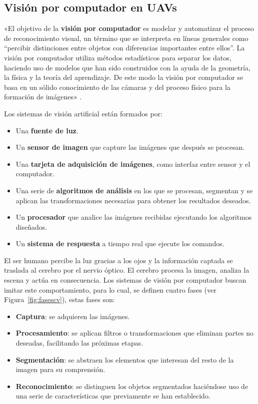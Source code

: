 \subsection{Visión por computador en \acs{UAV}s}
\label{sec:visionporcomputador}

«El objetivo de la \textbf{visión por computador} es modelar y automatizar el proceso de reconocimiento visual, un término que se interpreta en líneas generales como ``percibir distinciones entre objetos con diferencias importantes entre ellos''. La visión por computador utiliza métodos estadísticos para separar los datos, haciendo uso de modelos que han sido construidos con la ayuda de la geometría, la física y la teoría del aprendizaje. De este modo la visión por computador se basa en un sólido conocimiento de las cámaras y del proceso físico para la formación de imágenes» \cite{visionporcomputador}.

Los sistemas de visión artificial están formados por: 
\begin{itemize}
\item Una \textbf{fuente de luz}.
\item Un \textbf{sensor de imagen} que capture las imágenes que después se procesan.
\item Una \textbf{tarjeta de adquisición de imágenes}, como interfaz entre sensor y el computador.
\item Una serie de \textbf{algoritmos de análisis} en los que se procesan, segmentan y se aplican las transformaciones necesarias para obtener los resultados deseados. 
\item Un \textbf{procesador} que analice las imágenes recibidas ejecutando los algoritmos diseñados. 
\item Un \textbf{sistema de respuesta} a tiempo real que ejecute los comandos.
\end{itemize}

El ser humano percibe la luz gracias a los ojos y la información captada se traslada al cerebro por el nervio óptico. El cerebro procesa la imagen, analiza la escena y actúa en consecuencia. Los sistemas de visión por computador buscan imitar este comportamiento, para lo cual, se definen cuatro fases (ver Figura~\ref{fig:fasescv}), estas fases son:

\begin{itemize}
\item \textbf{Captura}: se adquieren las imágenes.
\item \textbf{Procesamiento}: se aplican filtros o transformaciones que eliminan partes no deseadas, facilitando las próximas etapas.
\item \textbf{Segmentación}: se abstraen los elementos que interesan del resto de la imagen para su comprensión.
\item \textbf{Reconocimiento}: se distinguen los objetos segmentados haciéndose uso de una serie de características que previamente se han establecido.
\end{itemize}

